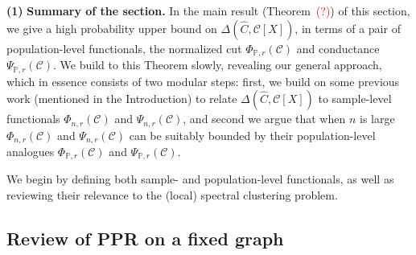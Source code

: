 \documentclass{article}
\newcommand{\1}{\mathbf{1}}
\newcommand{\mc}[1]{\mathcal{#1}}
\newcommand{\Pbb}{\mathbb{P}}
\newcommand{\wh}[1]{\widehat{#1}}
\theoremstyle{alden}
\theoremstyle{aldenthm}
\theoremstyle{definition}
\theoremstyle{remark}
\begin{document}
\textbf{(1)} \textbf{Summary of the section.} In the main result (Theorem~\textcolor{red}{(?)}) of this section, we give a high probability upper bound on $\Delta(\wh{C}, \mc{C}[X])$, in terms of a pair of population-level functionals, the normalized cut $\Phi_{\Pbb,r}(\mc{C})$ and conductance $\Psi_{\Pbb,r}(\mc{C})$. We build to this Theorem slowly, revealing our general approach, which in essence consists of two modular steps: first, we build on some previous work (mentioned in the Introduction) to relate $\Delta(\wh{C}, \mc{C}[X])$ to sample-level functionals $\Phi_{n,r}(\mc{C})$ and $\Psi_{n,r}(\mc{C})$, and second we argue that when $n$ is large $\Phi_{n,r}(\mc{C})$ and $\Psi_{n,r}(\mc{C})$ can be suitably bounded by their population-level analogues $\Phi_{\Pbb,r}(\mc{C})$ and $\Psi_{\Pbb,r}(\mc{C})$.

We begin by defining both sample- and population-level functionals, as well as reviewing their relevance to the (local) spectral clustering problem. 

\subsection{Review of PPR on a fixed graph}
\end{document}
